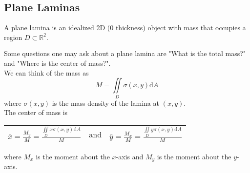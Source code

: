 \subsection{Plane Laminas}
\begin{definition}
	A plane lamina is an idealized 2D (0 thickness) object with mass that occupies a region $D\subset\mathbb{R}^2$.
\end{definition}

\noindent
Some questions one may ask about a plane lamina are "What is the total mass?" and "Where is the center of mass?".\\
We can think of the mass as $$M=\iint\limits_{D}{\sigma(x,y)\mathrm{d}A}$$ where $\sigma(x,y)$ is the mass density of the lamina at $(x,y)$.\\
The center of mass is
\begin{center}
	\begin{tabular}{ccc}
	 	$\bar{x}=\frac{M_y}{M}=\frac{\iint\limits_{D}{x\sigma(x,y)\mathrm{d}A}}{M}$ & and & $\bar{y}=\frac{M_x}{M}=\frac{\iint\limits_{D}{y\sigma(x,y)\mathrm{d}A}}{M}$ \\
	\end{tabular}
\end{center}
where $M_x$ is the moment about the $x$-axis and $M_y$ is the moment about the $y$-axis.